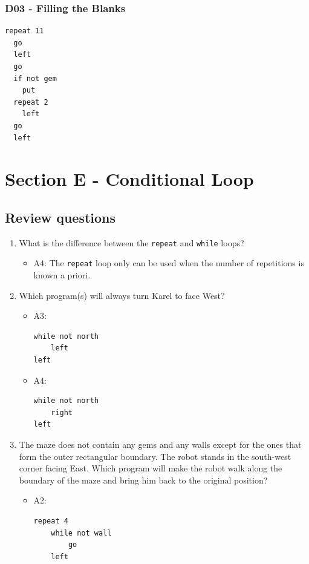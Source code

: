 \documentclass[article,A4,12pt]{llncs}
\begin{document}
\subsubsection{D03 - Filling the Blanks}
\begin{verbatim}
repeat 11
  go
  left
  go
  if not gem
    put
  repeat 2
    left
  go
  left
\end{verbatim}


\section{Section E - Conditional Loop}

\subsection{Review questions}

\begin{enumerate}
\item What is the difference between the {\tt repeat} and {\tt while} loops?
  \begin{itemize}
    \item A4: The {\tt repeat} loop only can be used when the number of repetitions is known a priori.
  \end{itemize}
\item Which program(s) will always turn Karel to face West?
  \begin{itemize}
    \item A3:
\begin{verbatim}
while not north
    left
left
\end{verbatim}
    \item A4:
\begin{verbatim}
while not north 
    right
left
\end{verbatim}
  \end{itemize}
\item The maze does not contain any gems and any walls except for the ones that 
      form the outer rectangular boundary.
      The robot stands in the south-west corner facing East. Which program will 
      make the robot walk along the 
      boundary of the maze and bring him back to the original position?
  \begin{itemize}
    \item A2:
\begin{verbatim}
repeat 4
    while not wall
        go
    left
\end{verbatim}
  \end{itemize}
\end{enumerate}
\end{document}
